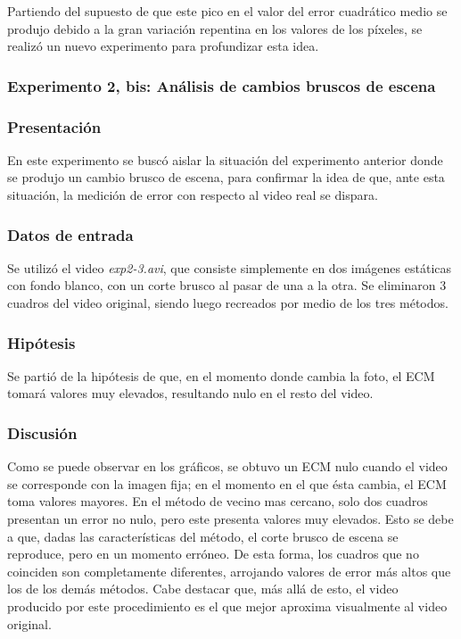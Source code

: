             Partiendo del supuesto de que este pico en el valor del error cuadrático medio se produjo debido a la gran variación repentina en los valores de los píxeles, se realizó un nuevo experimento para profundizar esta idea.

    \subsubsection{Experimento 2, bis: Análisis de cambios bruscos de escena}

        \subsubsection*{Presentación}

            En este experimento se buscó aislar la situación del experimento anterior donde se produjo un cambio brusco de escena, para confirmar la idea de que, ante esta situación, la medición de error con respecto al video real se dispara.

        \subsubsection*{Datos de entrada}

            Se utilizó el video \emph{exp2-3.avi}, que consiste simplemente en dos imágenes estáticas con fondo blanco, con un corte brusco al pasar de una a la otra. Se eliminaron 3 cuadros del video original, siendo luego recreados por medio de los tres métodos.

        \subsubsection*{Hipótesis}

            Se partió de la hipótesis de que, en el momento donde cambia la foto, el ECM tomará valores muy elevados, resultando nulo en el resto del video.

        \subsubsection*{Discusión}

            Como se puede observar en los gráficos, se obtuvo un ECM nulo cuando el video se corresponde con la imagen fija; en el momento en el que ésta cambia, el ECM toma valores mayores. En el método de vecino mas cercano, solo dos cuadros presentan un error no nulo, pero este presenta valores muy elevados. Esto se debe a que, dadas las características del método, el corte brusco de escena se reproduce, pero en un momento erróneo. De esta forma, los cuadros que no coinciden son completamente diferentes, arrojando valores de error más altos que los de los demás métodos. Cabe destacar que, más allá de esto, el video producido por este procedimiento es el que mejor aproxima visualmente al video original.


